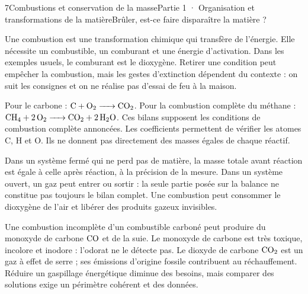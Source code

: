 \begin{ouverture}[college1]{7}{Combustions et conservation de la masse}{Partie 1 · Organisation et transformations de la matière}{Brûler, est-ce faire disparaître la matière ?}
\end{ouverture}
\label{ess-7}
Une combustion est une transformation chimique qui transfère de l’énergie. Elle nécessite un combustible, un comburant et une énergie d’activation. Dans les exemples usuels, le comburant est le dioxygène. Retirer une condition peut empêcher la combustion, mais les gestes d’extinction dépendent du contexte : on suit les consignes et on ne réalise pas d’essai de feu à la maison.\par
{}
Pour le carbone : $\ce{C + O2 -> CO2}$. Pour la combustion complète du méthane : $\ce{CH4 + 2O2 -> CO2 + 2H2O}$. Ces bilans supposent les conditions de combustion complète annoncées. Les coefficients permettent de vérifier les atomes C, H et O. Ils ne donnent pas directement des masses égales de chaque réactif.\par
\clearpage
{}
Dans un système fermé qui ne perd pas de matière, la masse totale avant réaction est égale à celle après réaction, à la précision de la mesure. Dans un système ouvert, un gaz peut entrer ou sortir : la seule partie posée sur la balance ne constitue pas toujours le bilan complet. Une combustion peut consommer le dioxygène de l’air et libérer des produits gazeux invisibles.\par
{}
Une combustion incomplète d’un combustible carboné peut produire du monoxyde de carbone $\ce{CO}$ et de la suie. Le monoxyde de carbone est très toxique, incolore et inodore : l’odorat ne le détecte pas. Le dioxyde de carbone $\ce{CO2}$ est un gaz à effet de serre ; ses émissions d’origine fossile contribuent au réchauffement. Réduire un gaspillage énergétique diminue des besoins, mais comparer des solutions exige un périmètre cohérent et des données.\par
